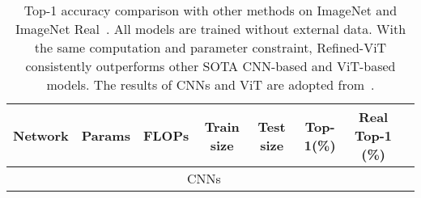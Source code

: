 \begin{table}[h]
    \centering
    \caption{\small Top-1 accuracy comparison with other methods on ImageNet \cite{deng2009imagenet}
    and ImageNet Real~\cite{beyer2020we}. All models are trained without external data. 
    With the same computation and parameter constraint, Refined-ViT consistently outperforms
    other SOTA CNN-based and ViT-based models. The results of CNNs and ViT are adopted from~\cite{touvron2021going}.}
    \label{tab:sota}
    \def \mysp {\hspace{7pt}}
    \centering \scalebox{1.0}
    {\small 
    \begin{tabular}{@{\ }lccccccc}
    \toprule
    Network  & Params & FLOPs & Train size & Test size  &  Top-1(\%)  & Real Top-1 (\%) \\
    \toprule
    \multicolumn{7}{c}{CNNs}\\
    \midrule


\end{tabular}}
\end{table}
